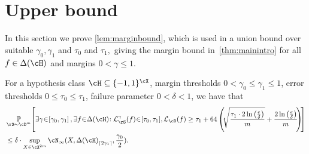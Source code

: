 \section{Upper bound}\label{sec:upperbound}
In this section we prove
\cref{lem:marginbound}, which is used in a
union bound over suitable $ \gamma_{0},\gamma_{1} $ and $ \tau_{0} $
and $ \tau_{1},$ giving the margin bound in~\cref{thm:mainintro} for all $ f\in\dlh $ and margins $ 0<\gamma\leq1.$
 \begin{lemma}\label{lem:marginbound}
    For a hypothesis class $ \cH \subseteq \{  -1,1\}^{\cX} $, margin thresholds  $ 0<\gamma_{0}\leq \gamma_{1}\leq 1 $, error thresholds $ 0\leq\tau_{0}\leq \tau_{1} $, failure parameter $0<\delta<1 $, we have that
    \begin{align*}
        &\p_{\rS\sim\cD^{m}}\negmedspace\left[
        \exists \gamma \negmedspace\in\negmedspace \left[\gamma_{0},\gamma_{1}\right]
        ,\exists f\negmedspace\in\negmedspace \dlh\negmedspace: 
        \ls_{\rS}^{\gamma}(f)\negmedspace\in \negmedspace[\tau_{0},\tau_{1}] 
        ,\ls_{\cD}(f) \geq \tau_{1} 
        + \cc\left(\negmedspace\sqrt{\frac{\tau_{1}\cdot 2 \ln{\left(\frac{e}{\delta} \right)}}{m}} 
        +\frac{2\ln{\left(\frac{e}{\delta} \right)}}{m}\negmedspace\right)
        \negmedspace\right] 
        \\
        &\leq\delta \cdot \sup_{X\in \cX^{2m}}   \cN_{\infty}(X,\dlh_{\left\lceil2\gamma_{1}\right\rceil},\frac{\gamma_{0}}{2}) .
    \end{align*}
 \end{lemma}

